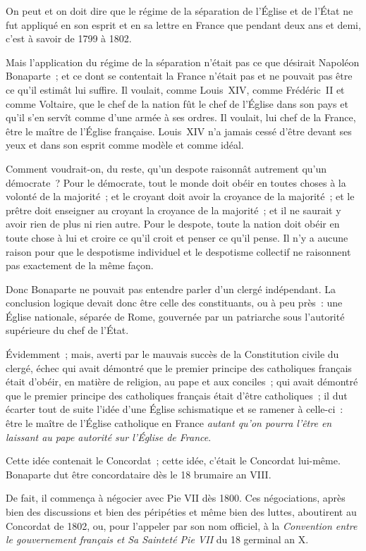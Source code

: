 \documentclass[french,twoside]{book} %
\begin{document}
On peut et on doit dire que le régime de la séparation de l’Église et de l’État ne fut appliqué en son esprit et en sa lettre en France que pendant deux ans et demi, c’est à savoir de 1799 à 1802.\par
Mais l’application du régime de la séparation n’était pas ce que désirait Napoléon Bonaparte ; et ce dont se contentait la France n’était pas et ne pouvait pas être ce qu’il estimât lui suffire. Il voulait, comme Louis XIV, comme Frédéric II et comme Voltaire, que le chef de la nation fût le chef de l’Église dans son pays et qu’il s’en servît comme d’une armée à ses ordres. Il voulait, lui  chef de la France, être le maître de l’Église française. Louis XIV n’a jamais cessé d’être devant ses yeux et dans son esprit comme modèle et comme idéal.\par
Comment voudrait-on, du reste, qu’un despote raisonnât autrement qu’un démocrate ? Pour le démocrate, tout le monde doit obéir en toutes choses à la volonté de la majorité ; et le croyant doit avoir la croyance de la majorité ; et le prêtre doit enseigner au croyant la croyance de la majorité ; et il ne saurait y avoir rien de plus ni rien autre. Pour le despote, toute la nation doit obéir en toute chose à lui et croire ce qu’il croit et penser ce qu’il pense. Il n’y a aucune raison pour que le despotisme individuel et le despotisme collectif ne raisonnent pas exactement de la même façon.\par
Donc Bonaparte ne pouvait pas entendre parler d’un clergé indépendant. La conclusion logique devait donc être celle des constituants, ou à peu près : une Église nationale, séparée de Rome, gouvernée par un patriarche sous l’autorité supérieure du chef de l’État.\par
Évidemment ; mais, averti par le mauvais succès de la Constitution civile du clergé, échec qui avait démontré que le premier principe des catholiques français était d’obéir, en matière de religion, au pape et aux conciles ; qui avait démontré  que le premier principe des catholiques français était d’être catholiques ; il dut écarter tout de suite l’idée d’une Église schismatique et se ramener à celle-ci : être le maître de l’Église catholique en France {\itshape autant qu’on pourra l’être en laissant au pape autorité sur l’Église de France}.\par
Cette idée contenait le Concordat ; cette idée, c’était le Concordat lui-même. Bonaparte dut être concordataire dès le 18 brumaire an VIII.\par
De fait, il commença à négocier avec Pie VII dès 1800. Ces négociations, après bien des discussions et bien des péripéties et même bien des luttes, aboutirent au Concordat de 1802, ou, pour l’appeler par son nom officiel, à la \emph{Convention entre le gouvernement français et Sa Sainteté Pie VII} du 18 germinal an X.\par
\end{document}

